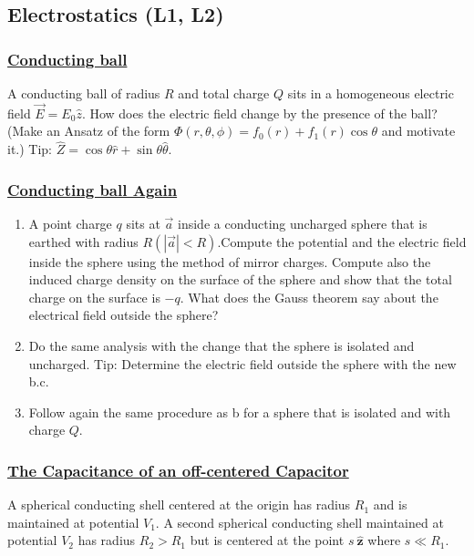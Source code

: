 \subsection{Electrostatics (\bf{L1, L2})}


\subsubsection{\hyperref[Conducting ball]{Conducting ball}}

A conducting ball of radius $R$ and total charge $Q$ sits in a homogeneous electric field $\vec{E}=E_{0} \hat{z}$. How does the electric field change by the presence of the ball? (Make an Ansatz of the form $\Phi(r, \theta, \phi)=f_{0}(r)+f_{1}(r) \cos \theta$ and motivate it.) Tip: $\hat{Z}=\cos \theta \hat{r}+\sin \theta \hat{\theta}$.

\subsubsection{\hyperref[Conducting ball Again]{Conducting ball Again}}

 \begin{enumerate}
	\item A point charge $q$ sits at $\vec{a}$ inside a conducting uncharged sphere that is earthed with radius $R(|\vec{a}|<R)$.Compute the potential and the electric field inside the sphere using the method of mirror charges. Compute also the induced charge density on the surface of the sphere and show that the total charge on the surface is $-q$. What does the Gauss theorem say about the electrical field outside the sphere?
	\item Do the same analysis with the change that the sphere is isolated and uncharged. Tip: Determine the electric field outside the sphere with the new b.c.
	\item Follow again the same procedure as b for a sphere that is isolated and with charge $Q$.
\end{enumerate}

\subsubsection{\hyperref[The Capacitance of an off-centered Capacitor]{The Capacitance of an off-centered Capacitor}} 

A spherical conducting shell centered at the origin has radius $R_{1}$ and is maintained at potential $V_{1}$. A second spherical conducting shell maintained at potential $V_{2}$ has radius $R_{2}>R_{1}$ but is centered at the point $s \:\hat{\mathbf{z}}$ where $s \ll R_{1}$.

